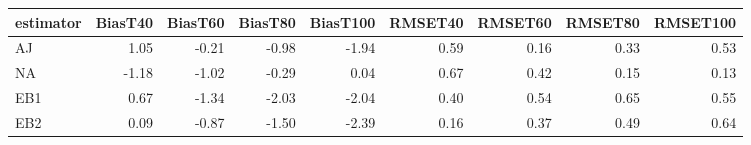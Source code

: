 \begin{table}[ht]
\centering
\begin{tabular}{lrrrrrrrr}
  \toprule
estimator & BiasT40 & BiasT60 & BiasT80 & BiasT100 & RMSET40 & RMSET60 & RMSET80 & RMSET100 \\ 
  \midrule
AJ & 1.05 & -0.21 & -0.98 & -1.94 & 0.59 & 0.16 & 0.33 & 0.53 \\ 
  NA & -1.18 & -1.02 & -0.29 & 0.04 & 0.67 & 0.42 & 0.15 & 0.13 \\ 
  EB1 & 0.67 & -1.34 & -2.03 & -2.04 & 0.40 & 0.54 & 0.65 & 0.55 \\ 
  EB2 & 0.09 & -0.87 & -1.50 & -2.39 & 0.16 & 0.37 & 0.49 & 0.64 \\ 
   \bottomrule
\end{tabular}
\end{table}
